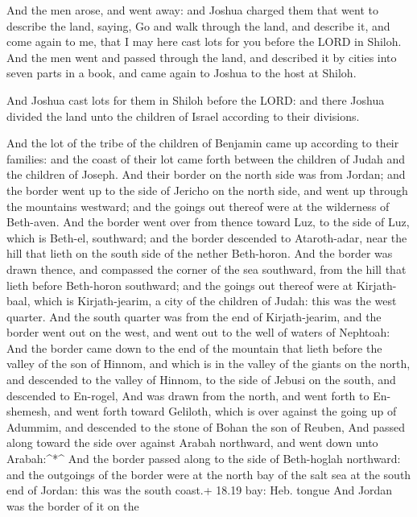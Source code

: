  And the men arose, and went away: and Joshua charged them
that went to describe the land, saying, Go and walk through the land,
and describe it, and come again to me, that I may here cast lots for you
before the LORD in Shiloh.  And the men went and passed
through the land, and described it by cities into seven parts in a book,
and came again to Joshua to the host at Shiloh.

 And Joshua cast lots for them in Shiloh before the LORD:
and there Joshua divided the land unto the children of Israel according
to their divisions.

 And the lot of the tribe of the children of Benjamin came
up according to their families: and the coast of their lot came forth
between the children of Judah and the children of Joseph. 
And their border on the north side was from Jordan; and the border went
up to the side of Jericho on the north side, and went up through the
mountains westward; and the goings out thereof were at the wilderness of
Beth-aven.  And the border went over from thence toward
Luz, to the side of Luz, which is Beth-el, southward; and the border
descended to Ataroth-adar, near the hill that lieth on the south side of
the nether Beth-horon.  And the border was drawn thence,
and compassed the corner of the sea southward, from the hill that lieth
before Beth-horon southward; and the goings out thereof were at
Kirjath-baal, which is Kirjath-jearim, a city of the children of Judah:
this was the west quarter.  And the south quarter was from
the end of Kirjath-jearim, and the border went out on the west, and went
out to the well of waters of Nephtoah:  And the border came
down to the end of the mountain that lieth before the valley of the son
of Hinnom, and which is in the valley of the giants on the north, and
descended to the valley of Hinnom, to the side of Jebusi on the south,
and descended to En-rogel,  And was drawn from the north,
and went forth to En-shemesh, and went forth toward Geliloth, which is
over against the going up of Adummim, and descended to the stone of
Bohan the son of Reuben,  And passed along toward the side
over against Arabah northward, and went down unto Arabah:\^{}*\^{}
 And the border passed along to the side of Beth-hoglah
northward: and the outgoings of the border were at the north bay of the
salt sea at the south end of Jordan: this was the south coast.+ 18.19
bay: Heb. tongue  And Jordan was the border of it on the
